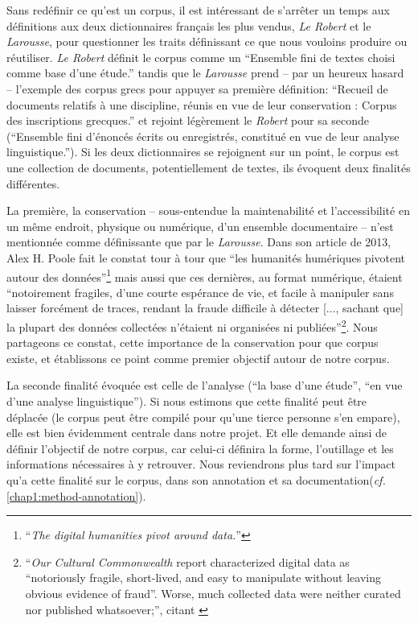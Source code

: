 Sans redéfinir ce qu'est un corpus, il est intéressant de s'arrêter un temps aux définitions aux deux dictionnaires français les plus vendus, \textit{Le Robert} et le \textit{Larousse}, pour questionner les traits définissant ce que nous vouloins produire ou réutiliser. \textit{Le Robert} définit le corpus comme un ``Ensemble fini de textes choisi comme base d'une étude.'' tandis que le \textit{Larousse} prend -- par un heureux hasard -- l'exemple des corpus grecs pour appuyer sa première définition: ``Recueil de documents relatifs à une discipline, réunis en vue de leur conservation : Corpus des inscriptions grecques.'' et rejoint légèrement le \textit{Robert} pour sa seconde (``Ensemble fini d'énoncés écrits ou enregistrés, constitué en vue de leur analyse linguistique.''). Si les deux dictionnaires se rejoignent sur un point, le corpus est une collection de documents, potentiellement de textes, ils évoquent deux finalités différentes. 

La première, la conservation -- sous-entendue la maintenabilité et l'accessibilité en un même endroit, physique ou numérique, d'un ensemble documentaire -- n'est mentionnée comme définissante que par le \textit{Larousse}. Dans son article de 2013, Alex H. Poole fait le constat tour à tour que ``les humanités humériques pivotent autour des données''\footnote{``\textit{The digital humanities pivot around data.}''\cite{poole_now_2013}} mais aussi que ces dernières, au format numérique, étaient ``notoirement fragiles, d'une courte espérance de vie, et facile à manipuler sans laisser forcément de traces, rendant la fraude difficile à détecter [..., sachant que] la plupart des données collectées n'étaient ni organisées ni publiées''\footnote{``\textit{Our Cultural Commonwealth} report characterized digital data as “notoriously fragile, short-lived, and easy to manipulate without leaving obvious evidence of fraud”. Worse, much collected data were neither curated nor published whatsoever;'', \cite{poole_now_2013} citant \cite{unsworth2006our}}. Nous partageons ce constat, cette importance de la conservation pour que corpus existe, et établissons ce point comme premier objectif autour de notre corpus. 

La seconde finalité évoquée est celle de l'analyse (``la base d'une étude'', ``en vue d'une analyse linguistique''). Si nous estimons que cette finalité peut être déplacée (le corpus peut être compilé pour qu'une tierce personne s'en empare), elle est bien évidemment centrale dans notre projet. Et elle demande ainsi de définir l'objectif de notre corpus, car celui-ci définira la forme, l'outillage et les informations nécessaires à y retrouver. Nous reviendrons plus tard sur l'impact qu'a cette finalité sur le corpus, dans son annotation et sa documentation(\textit{cf.} \ref{chap1:method-annotation}).

